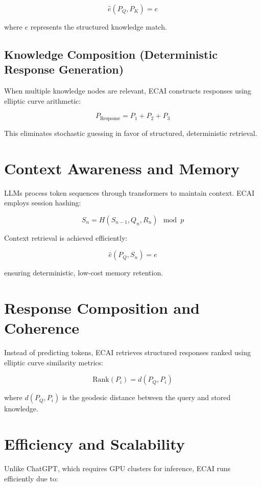 \documentclass{article}
\begin{document}
\begin{equation}
    \hat{e}(P_Q, P_K) = e
\end{equation}

where \( e \) represents the structured knowledge match.

\subsection{Knowledge Composition (Deterministic Response Generation)}
When multiple knowledge nodes are relevant, ECAI constructs responses using elliptic curve arithmetic:

\begin{equation}
    P_{\text{Response}} = P_1 + P_2 + P_3
\end{equation}

This eliminates stochastic guessing in favor of structured, deterministic retrieval.

\section{Context Awareness and Memory}
LLMs process token sequences through transformers to maintain context. ECAI employs session hashing:

\begin{equation}
    S_n = H(S_{n-1}, Q_n, R_n) \mod p
\end{equation}

Context retrieval is achieved efficiently:

\begin{equation}
    \hat{e}(P_Q, S_n) = e
\end{equation}

ensuring deterministic, low-cost memory retention.

\section{Response Composition and Coherence}
Instead of predicting tokens, ECAI retrieves structured responses ranked using elliptic curve similarity metrics:

\begin{equation}
    \text{Rank}(P_i) = d(P_Q, P_i)
\end{equation}

where \( d(P_Q, P_i) \) is the geodesic distance between the query and stored knowledge.

\section{Efficiency and Scalability}
Unlike ChatGPT, which requires GPU clusters for inference, ECAI runs efficiently due to:
\end{document}
